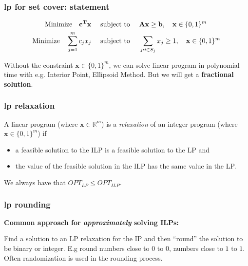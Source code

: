 \documentclass[compress]{beamer}
\newcommand{\bv}[1]{\mathbf{#1}}
\newcommand{\R}{\mathbb{R}}
\begin{document}
\begin{frame}
	\frametitle{lp for set cover: statement}
	\begin{align*}
		\textnormal{Minimize} \hspace{1em}
		\mathbf{c^T x} \hspace{1em}
		&\textnormal{ subject to } \hspace{1em}
		\mathbf{Ax \geq b}, \hspace{1em} \bv{x}\in \{0,1\}^m		\\
		\textnormal{Minimize} \hspace{1em}
		\sum_{j=1}^m c_j x_j \hspace{1em}
		&\textnormal{ subject to } \hspace{1em}
		\sum_{j: i \in S_j} x_j \geq 1,  \hspace{1em}  \bv{x}\in \{0,1\}^m
	\end{align*}
	
	Without the constraint $\bv{x}\in \{0,1\}^m$, we can solve  linear program
	in polynomial time with e.g. Interior Point,
	Ellipsoid Method. But we will get a \textbf{\alert{fractional solution}}.
\end{frame}

\begin{frame}
	\frametitle{lp relaxation}
	
	\begin{definition}[Relaxation]
		A linear program (where $\mathbf{x} \in \R^m$)
		is a \textit{relaxation} of an integer program
		(where $\mathbf{x} \in \{0,1\}^m$) if
		\begin{itemize}
			\item a feasible solution to the ILP is
			a feasible solution to the LP and
			\item the value of the feasible solution in
			the ILP has the same value in the LP.
		\end{itemize}
	\end{definition}
	
	\begin{center}
	We always have that $OPT_{LP} \leq OPT_{ILP}$.
	\end{center}
\end{frame}

\begin{frame}
		\frametitle{lp rounding}
		\textbf{Common approach for \emph{approximately} solving ILPs:} 
		
		Find a solution to an LP relaxation for the IP and then ``round'' the solution to be binary or integer. E.g round numbers close to $0$ to $0$, numbers close to $1$ to $1$. Often randomization is used in the rounding process. 
\end{frame}
\end{document}
